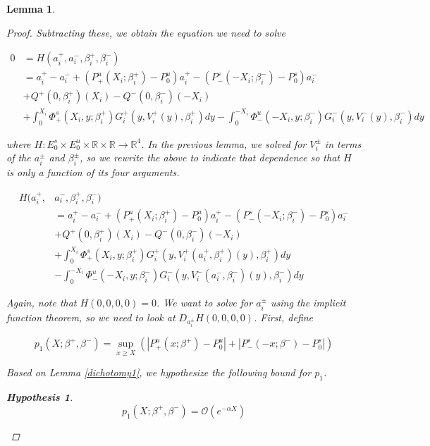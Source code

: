 \documentclass[12pt]{article}
\def\R{{\mathbb R}}
\newtheorem{lemma}{Lemma}
\newtheorem{hypothesis}{Hypothesis}
\begin{document}
\begin{lemma}
\begin{proof}
Subtracting these, we obtain the equation we need to solve

\begin{align*}
0 &= H(a_i^+, a_i^-, \beta_i^+, \beta_i^-) \\
&= a_i^+ - a_i^- + (P^u_+(X_i; \beta_i^+) -  P^u_0)a_i^+ - (P^s_-(-X_i; \beta_i^-) - P^s_0) a_i^-  \\
&+ Q^+(0, \beta_i^+)(X_i) - Q^-(0, \beta_i^-)(-X_i)\\
&+ \int_0^{X_i} \Phi_+^s(X_i, y; \beta_i^+) G_i^+(y, V_i^+(y),\beta_i^+)dy
- \int_0^{-X_i} \Phi_-^u(-X_i, y; \beta_i^-) G_i^-(y, V_i^-(y),\beta_i^-)dy 
\end{align*}

where $H: E_0^s \times E_0^u \times \R \times \R \rightarrow \R^4$. In the previous lemma, we solved for $V_i^\pm$ in terms of the $a_i^\pm$ and $\beta_i^\pm$, so we rewrite the above to indicate that dependence so that $H$ is only a function of its four arguments.

\begin{align*}
H(a_i^+, &a_i^-, \beta_i^+, \beta_i^-) \\
&= a_i^+ - a_i^- + (P^u_+(X_i; \beta_i^+) -  P^u_0)a_i^+ - (P^s_-(-X_i; \beta_i^-) - P^s_0) a_i^-  \\
&+ Q^+(0, \beta_i^+)(X_i) - Q^-(0, \beta_i^-)(-X_i)\\
&+ \int_0^{X_i} \Phi_+^s(X_i, y; \beta_i^+) G_i^+(y, V_i^+(a_i^+, \beta_i^+)(y),\beta_i^+)dy \\
&- \int_0^{-X_i} \Phi_-^u(-X_i, y; \beta_i^-) G_i^-(y, V_i^-(a_i^-, \beta_i^-)(y),\beta_i^-)dy 
\end{align*}

Again, note that $H(0, 0, 0, 0) = 0$. We want to solve for $a_i^\pm$ using the implicit function theorem, so we need to look at $D_{a_i^\pm} H(0, 0, 0, 0)$. First, define

\begin{equation}
p_1(X; \beta^+, \beta^-) = \sup_{x \geq X} (|P^u_+(x; \beta^+) - P_0^u| + |P^s_-(-x; \beta^-) - P_0^s|)
\end{equation}

Based on Lemma \ref{dichotomy1}, we hypothesize the following bound for $p_1$.

\begin{hypothesis}\label{p1existence}
\begin{equation}
p_1(X; \beta^+, \beta^-) = \mathcal{O}(e^{-\alpha X})
\end{equation} 
\end{hypothesis}


\end{proof}
\end{lemma}
\end{document}
